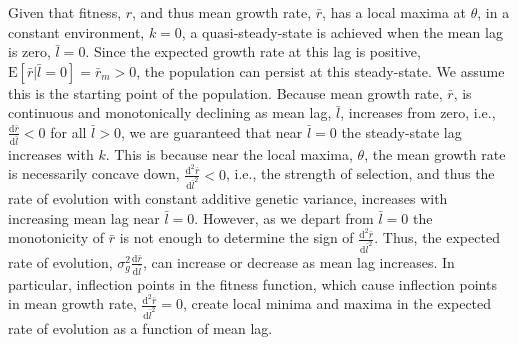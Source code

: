 \documentclass[12pt,letterpaper]{article} %
\begin{document}
Given that fitness, $r$, and thus mean growth rate, $\bar{r}$, has a local maxima at $\theta$, in a constant environment, $k=0$, a quasi-steady-state is achieved when the mean lag is zero, $\bar{l}=0$.
Since the expected growth rate at this lag is positive, $\mathrm{E}[\bar{r}|\bar{l}=0] = \bar{r}_m>0$, the population can persist at this steady-state.
We assume this is the starting point of the population.
Because mean growth rate, $\bar{r}$, is continuous and monotonically declining as mean lag, $\bar{l}$, increases from zero, i.e., $\frac{\mathrm{d}\bar{r}}{\mathrm{d}\bar{l}}<0$ for all $\bar{l}>0$, we are guaranteed that near $\bar{l}=0$ the steady-state lag increases with $k$.
This is because near the local maxima, $\theta$, the mean growth rate is necessarily concave down, $\frac{\mathrm{d}^2\bar{r}}{\mathrm{d}\bar{l}^2}<0$, i.e., the strength of selection, and thus the rate of evolution with constant additive genetic variance, increases with increasing mean lag near $\bar{l}=0$.
However, as we depart from $\bar{l}=0$ the monotonicity of $\bar{r}$ is not enough to determine the sign of  $\frac{\mathrm{d}^2\bar{r}}{\mathrm{d}\bar{l}^2}$.
Thus, the expected rate of evolution, $\sigma_g^2\frac{\mathrm{d}\bar{r}}{\mathrm{d}\bar{l}}$, can increase or decrease as mean lag increases.
In particular, inflection points in the fitness function, which cause inflection points in mean growth rate, $\frac{\mathrm{d}^2\bar{r}}{\mathrm{d}\bar{l}^2}=0$, create local minima and maxima in the expected rate of evolution as a function of mean lag.
\end{document}
